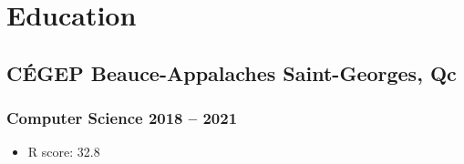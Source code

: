 \documentclass[10pt]{article} %
\begin{document}
\section{Education}
\subsection{CÉGEP Beauce-Appalaches \hfill Saint-Georges, Qc}
\subsubsection{Computer Science \hfill 2018 -- 2021}
\begin{itemize}
	\item R score: 32.8
\end{itemize}
\end{document}
